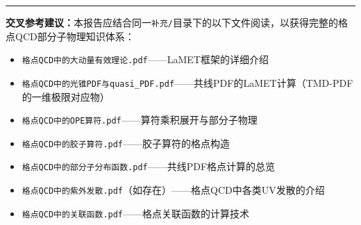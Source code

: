 \documentclass[12pt,a4paper]{ctexart}
\theoremstyle{definition}
\begin{document}
\vspace{1cm}
\noindent\rule{\textwidth}{0.5pt}
\small
\textbf{交叉参考建议：}本报告应结合同一\texttt{补充/}目录下的以下文件阅读，以获得完整的格点QCD部分子物理知识体系：
\begin{itemize}
    \item \texttt{格点QCD中的大动量有效理论.pdf}——LaMET框架的详细介绍
    \item \texttt{格点QCD中的光锥PDF与quasi\_PDF.pdf}——共线PDF的LaMET计算（TMD-PDF的一维极限对应物）
    \item \texttt{格点QCD中的OPE算符.pdf}——算符乘积展开与部分子物理
    \item \texttt{格点QCD中的胶子算符.pdf}——胶子算符的格点构造
    \item \texttt{格点QCD中的部分子分布函数.pdf}——共线PDF格点计算的总览
    \item \texttt{格点QCD中的紫外发散.pdf}（如存在）——格点QCD中各类UV发散的介绍
    \item \texttt{格点QCD中的关联函数.pdf}——格点关联函数的计算技术
\end{itemize}
\end{document}
